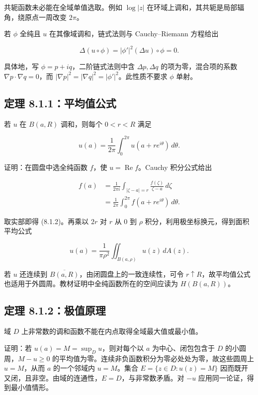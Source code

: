 \documentclass[11pt,a4paper]{article}
\begin{document}
共轭函数未必能在全域单值选取。例如 \(\log|z|\)
在环域上调和，其共轭是局部辐角，绕原点一周改变 \(2\pi\)。

若 \(\phi\) 全纯且 \(u\) 在其像域调和，链式法则与 Cauchy--Riemann
方程给出

\[
\Delta(u\circ\phi)=|\phi'|^2(\Delta u)\circ\phi=0.\tag{8.1.A}
\]

具体地，写 \(\phi=p+iq\)，二阶链式法则中含 \(\Delta p,\Delta q\)
的项为零，混合项的系数 \(\nabla p\cdot\nabla q=0\)，而
\(|\nabla p|^2=|\nabla q|^2=|\phi'|^2\)。此性质不要求 \(\phi\) 单射。

\subsection{定理 8.1.1：平均值公式}\label{ch08-s1-heading-3}

若 \(u\) 在 \(B(a,R)\) 调和，则每个 \(0<r<R\) 满足

\[
u(a)=\frac1{2\pi}\int_0^{2\pi}u(a+re^{i\theta})\,d\theta.\tag{8.1.2}
\]

证明：在圆盘中选全纯函数 \(f\)，使 \(u=\operatorname{Re}f\)。Cauchy
积分公式给出

\[
\begin{aligned}
f(a)&=\frac1{2\pi i}\int_{|\zeta-a|=r}\frac{f(\zeta)}{\zeta-a}\,d\zeta\\
&=\frac1{2\pi}\int_0^{2\pi}f(a+re^{i\theta})\,d\theta.
\end{aligned}\tag{8.1.1}
\]

取实部即得 (8.1.2)。再乘以 \(2r\) 对 \(r\) 从 \(0\) 到 \(\rho\)
积分，利用极坐标换元，得到面积平均公式

\[
u(a)=\frac1{\pi\rho^2}\iint_{B(a,\rho)}u(z)\,dA(z).\tag{8.1.B}
\]

若 \(u\) 还连续到 \(\overline{B(a,R)}\)，由闭圆盘上的一致连续性，可令
\(r\uparrow R\)，故平均值公式也适用于外圆周。教材证明中全纯函数所在的空间应读为
\(H(B(a,R))\)。

\subsection{定理 8.1.2：极值原理}\label{ch08-s1-heading-4}

域 \(D\) 上非常数的调和函数不能在内点取得全域最大值或最小值。

证明：若 \(u(a)=M=\sup_Du\)，则对每个以 \(a\) 为中心、闭包包含于 \(D\)
的小圆周，\(M-u\ge0\)
的平均值为零。连续非负函数积分为零必处处为零，故这些圆周上 \(u=M\)，从而
\(a\) 的一个邻域内 \(u=M\)。集合 \(E=\{z\in D:u(z)=M\}\)
因而既开又闭，且非空。由域的连通性，\(E=D\)，与非常数矛盾。对 \(-u\)
应用同一论证，得到最小值情形。
\end{document}
